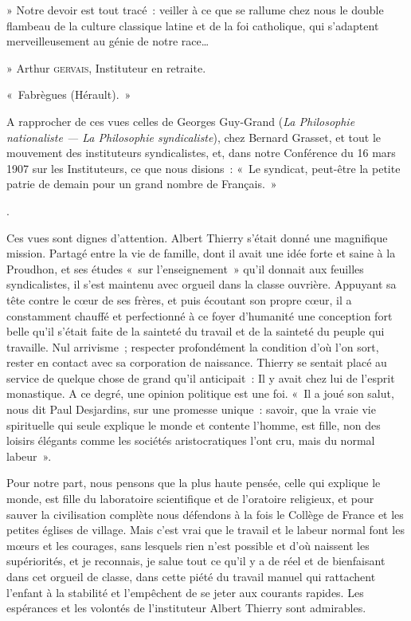 \documentclass[french,twoside]{book} %
\newcommand\surname[1]{\textsc{#1}}
\begin{document}
{ » Notre devoir est tout tracé : veiller à ce que se rallume chez nous le double flambeau de la culture classique latine et de la foi catholique, qui s’adaptent merveilleusement au génie de notre race…‌\par
  \noindent » Arthur \surname{gervais}, Instituteur en retraite.‌\par
 « Fabrègues (Hérault). »‌
 \par
\noindent A rapprocher de ces vues celles de Georges Guy-Grand ({\itshape La Philosophie nationaliste — La Philosophie syndicaliste}), chez Bernard Grasset, et tout le mouvement des instituteurs syndicalistes, et, dans notre Conférence du 16 mars 1907 sur les Instituteurs, ce que nous disions : « Le syndicat, peut-être la petite patrie de demain pour un grand nombre de Français. »
 }.‌\par
Ces vues sont dignes d’attention. Albert Thierry s’était donné une magnifique mission. Partagé entre la vie de famille, dont il avait une idée forte et saine à la Proudhon, et ses études « sur l’enseignement » qu’il donnait aux feuilles syndicalistes, il s’est maintenu avec orgueil dans la classe ouvrière. Appuyant sa tête contre le cœur de ses frères, et puis écoutant son propre cœur, il a constamment chauffé et perfectionné à ce foyer d’humanité une conception fort belle qu’il s’était faite de la sainteté du travail et de la sainteté du peuple qui travaille. Nul arrivisme ; respecter profondément la condition d’où l’on sort, rester en contact avec sa corporation de naissance. Thierry se sentait placé au service de quelque chose de grand qu’il anticipait : Il y avait chez lui de l’esprit monastique. A ce degré, une opinion politique est une foi. « Il a joué son salut, nous dit Paul Desjardins, sur une promesse unique : savoir, que la vraie vie spirituelle qui seule explique le monde et contente l’homme, est fille, non des loisirs élégants comme les sociétés aristocratiques l’ont cru, mais du normal labeur ».\par
Pour notre part, nous pensons que la plus haute pensée, celle qui explique le monde, est fille du laboratoire scientifique et de l’oratoire religieux, et pour sauver la civilisation complète nous défendons à la fois le Collège de France et les petites églises de village. Mais c’est vrai que le travail et le labeur normal font les mœurs et les courages, sans lesquels rien n’est possible et d’où naissent les supériorités, et je reconnais, je salue tout ce qu’il y a de réel et de bienfaisant dans cet orgueil de classe, dans cette piété du travail manuel qui rattachent l’enfant à la stabilité et l’empêchent de se jeter aux courants rapides. Les espérances et les volontés de l’instituteur Albert Thierry sont admirables.‌\par
\end{document}

